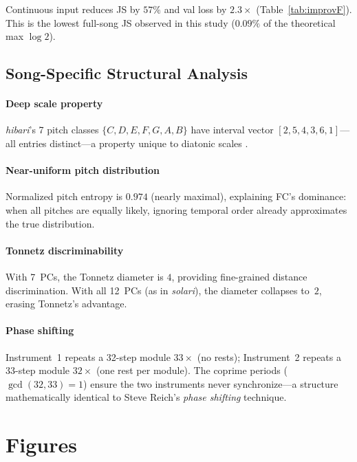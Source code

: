 \documentclass[conference,10pt,a4paper]{IEEEtran}
\begin{document}
Continuous input reduces JS by $57\%$ and val loss by $2.3\times$
(Table~\ref{tab:improvF}).  This is the lowest full-song JS observed
in this study ($0.09\%$ of the theoretical max $\log 2$).

\subsection{Song-Specific Structural Analysis}
\label{subsec:structure}

\paragraph{Deep scale property}
\emph{hibari}'s 7 pitch classes $\{C, D, E, F, G, A, B\}$ have interval
vector $[2,5,4,3,6,1]$---all entries distinct---a property unique to
diatonic scales \cite{gamer2003}.

\paragraph{Near-uniform pitch distribution}
\label{subsec:phase}
Normalized pitch entropy is $0.974$ (nearly maximal), explaining FC's
dominance: when all pitches are equally likely, ignoring temporal order
already approximates the true distribution.

\paragraph{Tonnetz discriminability}
With 7~PCs, the Tonnetz diameter is $4$, providing fine-grained
distance discrimination.  With all 12~PCs (as in \emph{solari}), the
diameter collapses to~$2$, erasing Tonnetz's advantage.

\paragraph{Phase shifting}
Instrument~1 repeats a 32-step module $33\times$ (no rests);
Instrument~2 repeats a 33-step module $32\times$ (one rest per module).
The coprime periods ($\gcd(32,33) = 1$) ensure the two instruments never
synchronize---a structure mathematically identical to Steve Reich's
\emph{phase shifting} technique.


\section{Figures}
\label{sec:figures}
\end{document}
